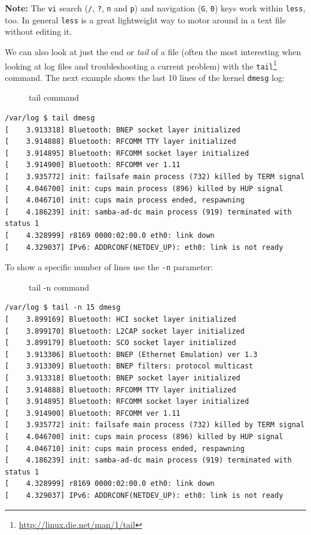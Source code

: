 \documentclass[10pt,]{book}
\renewcommand{\href}[2]{#2\footnote{\url{#1}}}
\numberwithin{figure}{chapter}
\DeclareRobustCommand{\drcap}[1]{\begin{figure}[H]\caption{#1}\end{figure}}
\DeclareRobustCommand{\drcmd}[1]{\index{Commands!#1}}
\begin{document}
\textbf{Note:} The \texttt{vi}\drcmd{vi} search (\texttt{/}, \texttt{?},
\texttt{n} and \texttt{p}) and navigation (\texttt{G}, \texttt{0}) keys
work within \texttt{less}, too. In general \texttt{less} is a great
lightweight way to motor around in a text file without editing it.

We can also look at just the end or \emph{tail} of a file (often the
most interesting when looking at log files and troubleshooting a current
problem) with the
\href{http://linux.die.net/man/1/tail}{\texttt{tail}}\drcmd{tail}
command. The next example shows the last 10 lines of the kernel
\texttt{dmesg} log:

\drcap{tail command}

\begin{verbatim}
/var/log $ tail dmesg
[    3.913318] Bluetooth: BNEP socket layer initialized
[    3.914888] Bluetooth: RFCOMM TTY layer initialized
[    3.914895] Bluetooth: RFCOMM socket layer initialized
[    3.914900] Bluetooth: RFCOMM ver 1.11
[    3.935772] init: failsafe main process (732) killed by TERM signal
[    4.046700] init: cups main process (896) killed by HUP signal
[    4.046710] init: cups main process ended, respawning
[    4.186239] init: samba-ad-dc main process (919) terminated with status 1
[    4.328999] r8169 0000:02:00.0 eth0: link down
[    4.329037] IPv6: ADDRCONF(NETDEV_UP): eth0: link is not ready
\end{verbatim}

To show a specific number of lines use the \texttt{-n} parameter:

\drcap{tail -n command}

\begin{verbatim}
/var/log $ tail -n 15 dmesg
[    3.899169] Bluetooth: HCI socket layer initialized
[    3.899170] Bluetooth: L2CAP socket layer initialized
[    3.899179] Bluetooth: SCO socket layer initialized
[    3.913306] Bluetooth: BNEP (Ethernet Emulation) ver 1.3
[    3.913309] Bluetooth: BNEP filters: protocol multicast
[    3.913318] Bluetooth: BNEP socket layer initialized
[    3.914888] Bluetooth: RFCOMM TTY layer initialized
[    3.914895] Bluetooth: RFCOMM socket layer initialized
[    3.914900] Bluetooth: RFCOMM ver 1.11
[    3.935772] init: failsafe main process (732) killed by TERM signal
[    4.046700] init: cups main process (896) killed by HUP signal
[    4.046710] init: cups main process ended, respawning
[    4.186239] init: samba-ad-dc main process (919) terminated with status 1
[    4.328999] r8169 0000:02:00.0 eth0: link down
[    4.329037] IPv6: ADDRCONF(NETDEV_UP): eth0: link is not ready
\end{verbatim}
\end{document}
